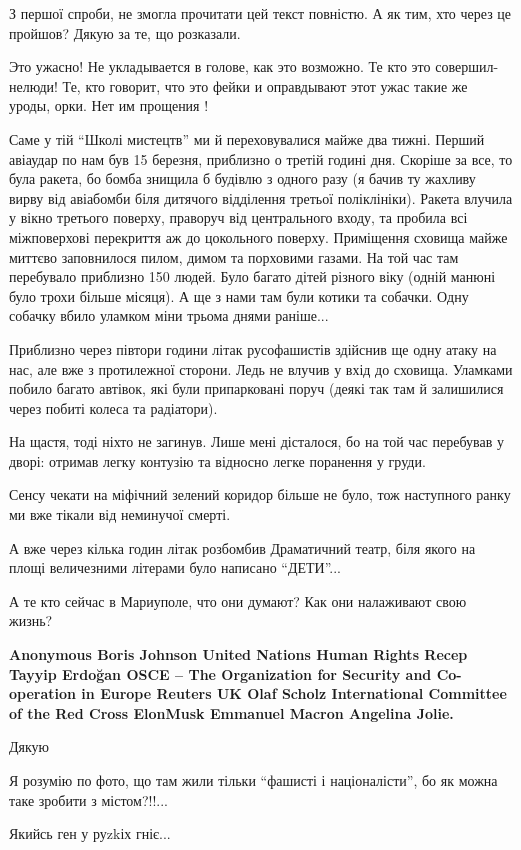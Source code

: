 \begin{itemize}

З першої спроби, не змогла прочитати цей текст повністю. А як тим, хто через це
пройшов? Дякую за те, що розказали.


Это ужасно! Не укладывается в голове, как это возможно. Те кто это совершил-
нелюди! Те, кто говорит, что это фейки и оправдывают этот ужас такие же уроды,
орки. Нет им прощения !


Саме у тій \enquote{Школі мистецтв} ми й переховувалися майже два тижні. Перший
авіаудар по нам був 15 березня, приблизно о третій годині дня. Скоріше за все,
то була ракета, бо бомба знищила б будівлю з одного разу (я бачив ту жахливу
вирву від авіабомби біля дитячого відділення третьої поліклініки). Ракета
влучила у вікно третього поверху, праворуч від центрального входу, та пробила
всі міжповерхові перекриття аж до цокольного поверху. Приміщення сховища майже
миттєво заповнилося пилом, димом та порховими газами. На той час там перебувало
приблизно 150 людей. Було багато дітей різного віку (одній манюні було трохи
більше місяця). А ще з нами там були котики та собачки. Одну собачку вбило
уламком міни трьома днями раніше...

Приблизно через півтори години літак русофашистів здійснив ще одну атаку на
нас, але вже з протилежної сторони. Ледь не влучив у вхід до сховища. Уламками
побило багато автівок, які були припарковані поруч (деякі так там й залишилися
через побиті колеса та радіатори).

На щастя, тоді ніхто не загинув. Лише мені дісталося, бо на той час перебував у
дворі: отримав легку контузію та відносно легке поранення у груди.

Сенсу чекати на міфічний зелений коридор більше не було, тож наступного ранку
ми вже тікали від неминучої смерті.

А вже через кілька годин літак розбомбив Драматичний театр, біля якого на площі
величезними літерами було написано \enquote{ДЕТИ}...


А те кто сейчас в Мариуполе, что они думают? Как они налаживают свою жизнь?


\obeycr
\bfseries
Anonymous
Boris Johnson
United Nations Human Rights
Recep Tayyip Erdoğan
OSCE – The Organization for Security and Co-operation in Europe
Reuters UK
Olaf Scholz
International Committee of the Red Cross
ElonMusk
Emmanuel Macron
Angelina Jolie.
\restorecr

Дякую


Я розумію по фото, що там жили тільки \enquote{фашисті і націоналісти}, бо як
можна таке зробити з містом?!!...

Якийсь ген у руzkіх гніє...


\end{itemize} %
